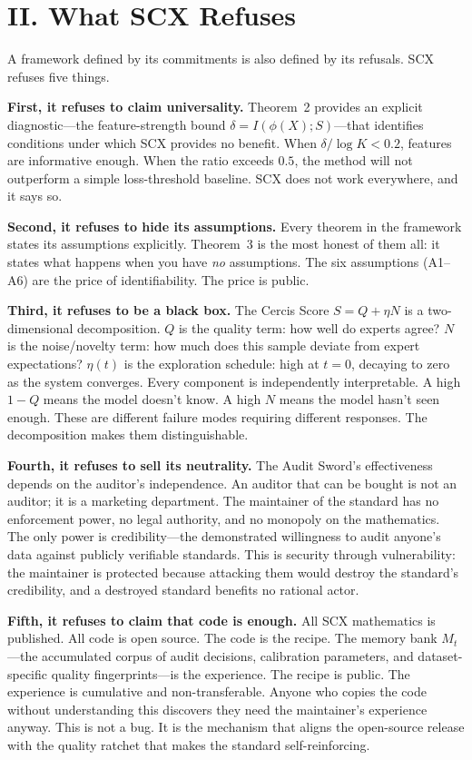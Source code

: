 \documentclass[11pt,a4paper]{article}
\theoremstyle{definition}
\begin{document}
\section*{II. What SCX Refuses}

A framework defined by its commitments is also defined by its refusals. SCX refuses five things.

\textbf{First, it refuses to claim universality.} Theorem~2 provides an explicit diagnostic---the feature-strength bound $\delta = I(\phi(X); S)$---that identifies conditions under which SCX provides no benefit. When $\delta / \log K < 0.2$, features are informative enough. When the ratio exceeds $0.5$, the method will not outperform a simple loss-threshold baseline. SCX does not work everywhere, and it says so.

\textbf{Second, it refuses to hide its assumptions.} Every theorem in the framework states its assumptions explicitly. Theorem~3 is the most honest of them all: it states what happens when you have \textit{no} assumptions. The six assumptions (A1--A6) are the price of identifiability. The price is public.

\textbf{Third, it refuses to be a black box.} The Cercis Score $S = Q + \eta N$ is a two-dimensional decomposition. $Q$ is the quality term: how well do experts agree? $N$ is the noise/novelty term: how much does this sample deviate from expert expectations? $\eta(t)$ is the exploration schedule: high at $t=0$, decaying to zero as the system converges. Every component is independently interpretable. A high $1-Q$ means the model doesn't know. A high $N$ means the model hasn't seen enough. These are different failure modes requiring different responses. The decomposition makes them distinguishable.

\textbf{Fourth, it refuses to sell its neutrality.} The Audit Sword's effectiveness depends on the auditor's independence. An auditor that can be bought is not an auditor; it is a marketing department. The maintainer of the standard has no enforcement power, no legal authority, and no monopoly on the mathematics. The only power is credibility---the demonstrated willingness to audit anyone's data against publicly verifiable standards. This is security through vulnerability: the maintainer is protected because attacking them would destroy the standard's credibility, and a destroyed standard benefits no rational actor.

\textbf{Fifth, it refuses to claim that code is enough.} All SCX mathematics is published. All code is open source. The code is the recipe. The memory bank $M_t$---the accumulated corpus of audit decisions, calibration parameters, and dataset-specific quality fingerprints---is the experience. The recipe is public. The experience is cumulative and non-transferable. Anyone who copies the code without understanding this discovers they need the maintainer's experience anyway. This is not a bug. It is the mechanism that aligns the open-source release with the quality ratchet that makes the standard self-reinforcing.
\end{document}
